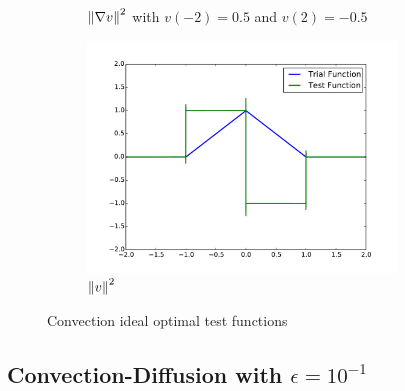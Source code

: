 \documentclass{article}
\begin{document}
\begin{figure}[ht]
\begin{subfigure}[t]{0.45\textwidth}
\caption{$\left\| \nabla v \right\|^2$ with $v(-2)=0.5$ and  $v(2)=-0.5$}
\end{subfigure}
\begin{subfigure}[t]{0.45\textwidth}
\centering
\includegraphics[width=0.9\textwidth]{OptimalTestFunctions/SpecialCases/ConvectionL2NoBC.pdf}
\caption{$\left\| v \right\|^2$}
\end{subfigure}
\caption{Convection ideal optimal test functions}
\end{figure}

\clearpage
\subsection*{Convection-Diffusion with $\epsilon=10^{-1}$}
\end{document}
